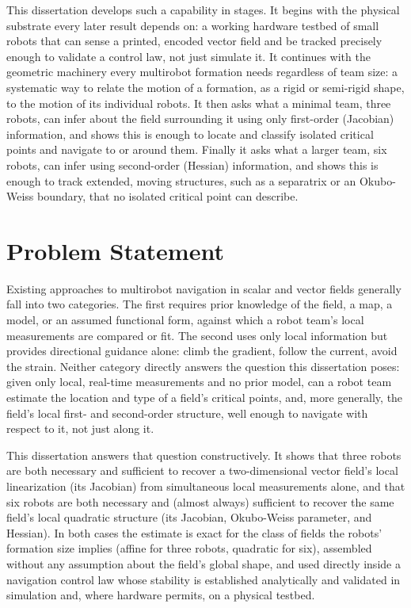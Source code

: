 \documentclass[12pt, letterpaper, oneside]{report}
\begin{document}
This dissertation develops such a capability in stages. It begins with the
physical substrate every later result depends on: a working hardware testbed
of small robots that can sense a printed, encoded vector field and be
tracked precisely enough to validate a control law, not just simulate it. It
continues with the geometric machinery every multirobot formation needs
regardless of team size: a systematic way to relate the motion of a formation,
as a rigid or semi-rigid shape, to the motion of its individual robots. It
then asks what a minimal team, three robots, can infer about the field
surrounding it using only first-order (Jacobian) information, and shows this
is enough to locate and classify isolated critical points and navigate to or
around them. Finally it asks what a larger team, six robots, can infer using
second-order (Hessian) information, and shows this is enough to track
extended, moving structures, such as a separatrix or an Okubo-Weiss boundary,
that no isolated critical point can describe.

\section{Problem Statement}

Existing approaches to multirobot navigation in scalar and vector fields
generally fall into two categories. The first requires prior knowledge of
the field, a map, a model, or an assumed functional form, against which a
robot team's local measurements are compared or fit. The second uses only
local information but provides directional guidance alone: climb the
gradient, follow the current, avoid the strain. Neither category directly
answers the question this dissertation poses: given only local, real-time
measurements and no prior model, can a robot team estimate the location and
type of a field's critical points, and, more generally, the field's local
first- and second-order structure, well enough to navigate with respect to
it, not just along it.

This dissertation answers that question constructively. It shows that three
robots are both necessary and sufficient to recover a two-dimensional vector
field's local linearization (its Jacobian) from simultaneous local
measurements alone, and that six robots are both necessary and (almost
always) sufficient to recover the same field's local quadratic structure
(its Jacobian, Okubo-Weiss parameter, and Hessian). In both cases the
estimate is exact for the class of fields the robots' formation size implies
(affine for three robots, quadratic for six), assembled without any
assumption about the field's global shape, and used directly inside a
navigation control law whose stability is established analytically and
validated in simulation and, where hardware permits, on a physical testbed.
\end{document}
